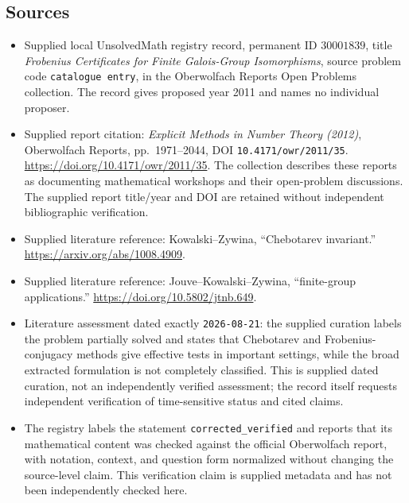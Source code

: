 \documentclass[11pt]{article}
\begin{document}
\subsection{Sources}
\begin{itemize}
\item Supplied local UnsolvedMath registry record, permanent ID \(30001839\), title \emph{Frobenius Certificates for Finite Galois-Group Isomorphisms}, source problem code \texttt{catalogue entry}, in the Oberwolfach Reports Open Problems collection. The record gives proposed year 2011 and names no individual proposer.
\item Supplied report citation: \emph{Explicit Methods in Number Theory (2012)}, Oberwolfach Reports, pp.~1971--2044, DOI \texttt{10.4171/owr/2011/35}. \url{https://doi.org/10.4171/owr/2011/35}. The collection describes these reports as documenting mathematical workshops and their open-problem discussions. The supplied report title/year and DOI are retained without independent bibliographic verification.
\item Supplied literature reference: Kowalski--Zywina, ``Chebotarev invariant.'' \url{https://arxiv.org/abs/1008.4909}.
\item Supplied literature reference: Jouve--Kowalski--Zywina, ``finite-group applications.'' \url{https://doi.org/10.5802/jtnb.649}.
\item Literature assessment dated exactly \texttt{2026-08-21}: the supplied curation labels the problem partially solved and states that Chebotarev and Frobenius-conjugacy methods give effective tests in important settings, while the broad extracted formulation is not completely classified. This is supplied dated curation, not an independently verified assessment; the record itself requests independent verification of time-sensitive status and cited claims.
\item The registry labels the statement \texttt{corrected\_verified} and reports that its mathematical content was checked against the official Oberwolfach report, with notation, context, and question form normalized without changing the source-level claim. This verification claim is supplied metadata and has not been independently checked here.
\end{itemize}
\end{document}
